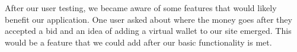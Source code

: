 After our user testing, we became aware of some features that would likely benefit our application. One user asked about where the money goes after they accepted a bid and an idea of adding a virtual wallet to our site emerged. This would be a feature that we could add after our basic functionality is met.
